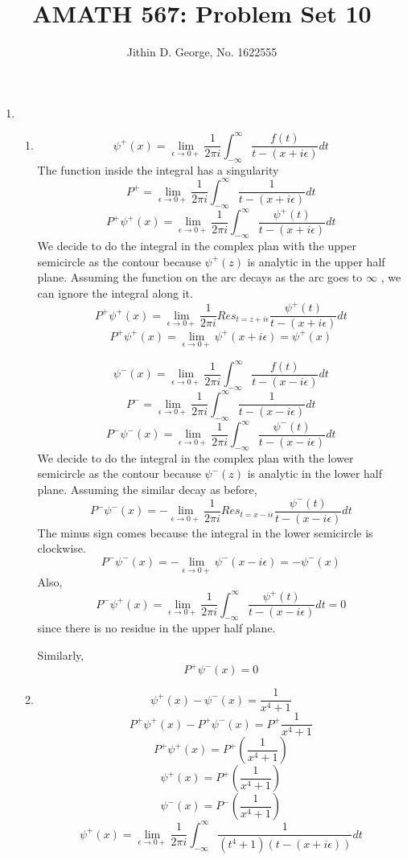 \documentclass[a4paper]{article}
\title{AMATH 567: Problem Set 10}
\author{Jithin D. George, No. 1622555}
\begin{document}
\maketitle
\begin{enumerate}

	
	\item 
\begin{enumerate}
	
	\item
		\[\psi^{+}(x)= \lim_{\epsilon \to 0+} \frac{1}{2\pi i} \int_{-\infty}^\infty \frac{f(t)}{t - (x+i\epsilon)}dt\]
		The function inside the integral has a singularity
		\[P^{+}= \lim_{\epsilon \to 0+} \frac{1}{2\pi i} \int_{-\infty}^\infty \frac{1}{t - (x+i\epsilon)}dt\]	
		\[P^{+}\psi^{+}(x)= \lim_{\epsilon \to 0+} \frac{1}{2\pi i} \int_{-\infty}^\infty \frac{\psi^{+}(t)}{t - (x+i\epsilon)}dt\]	
We decide to do the integral in the complex plan with the upper semicircle as the contour because $\psi^{+}(z) $ is analytic in the upper half plane. Assuming the function on the arc decays as the arc goes to $\infty$ , we can ignore the integral along it.	
		\[P^{+}\psi^{+}(x)= \lim_{\epsilon \to 0+} \frac{1}{2\pi i} Res_{t = z+i\epsilon} \frac{\psi^{+}(t)}{t - (x+i\epsilon)}dt\]		
		\[P^{+}\psi^{+}(x)= \lim_{\epsilon \to 0+} \psi^{+}(x+i\epsilon) =\psi^{+}(x) \]	
		
			\[\psi^{-}(x)= \lim_{\epsilon \to 0+} \frac{1}{2\pi i} \int_{-\infty}^\infty \frac{f(t)}{t - (x-i\epsilon)}dt\]		
	\[P^{-}= \lim_{\epsilon \to 0+} \frac{1}{2\pi i} \int_{-\infty}^\infty \frac{1}{t - (x-i\epsilon)}dt\]	
	\[P^{-}\psi^{-}(x)= \lim_{\epsilon \to 0+} \frac{1}{2\pi i} \int_{-\infty}^\infty \frac{\psi^{-}(t)}{t - (x-i\epsilon)}dt\]	
We decide to do the integral in the complex plan with the lower semicircle as the contour because $\psi^{-}(z) $ is analytic in the lower half plane. Assuming the similar decay as before,
		\[P^{-}\psi^{-}(x)= -\lim_{\epsilon \to 0+} \frac{1}{2\pi i} Res_{t = x-i\epsilon} \frac{\psi^{-}(t)}{t - (x-i\epsilon)}dt\]
		The minus sign comes because the integral in the lower semicircle is clockwise.		
		\[P^{-}\psi^{-}(x)= -\lim_{\epsilon \to 0+} \psi^{-}(x-i\epsilon) =-\psi^{-}(x) \]
Also, 		
	\[P^{-}\psi^{+}(x)= \lim_{\epsilon \to 0+} \frac{1}{2\pi i} \int_{-\infty}^\infty \frac{\psi^{+}(t)}{t - (x-i\epsilon)}dt =0\]
	since there is no residue in the upper half plane.
	
Similarly, 	
	\[P^{+}\psi^{-}(x) =0\]
	
	\item  \[\psi^{+}(x) -\psi^{-}(x)= \frac{1}{x^4+1}\]
	\[P^{+}\psi^{+}(x) -P^{+}\psi^{-}(x)= P^{+}\frac{1}{x^4+1}\]
	\[P^{+}\psi^{+}(x)=P^{+}(\frac{1}{x^4+1})\]
		\[\psi^{+}(x)=P^{+}(\frac{1}{x^4+1})\]		
 	\[\psi^{-}(x)=P^{-}(\frac{1}{x^4+1})\]	
 		\[\psi^{+}(x)=\lim_{\epsilon \to 0+}\frac{1}{2\pi i}\int_{-\infty}^\infty \frac{1}{(t^4+1)(t - (x+i\epsilon))}dt\]
	

\end{enumerate}
\end{enumerate}
\end{document}
